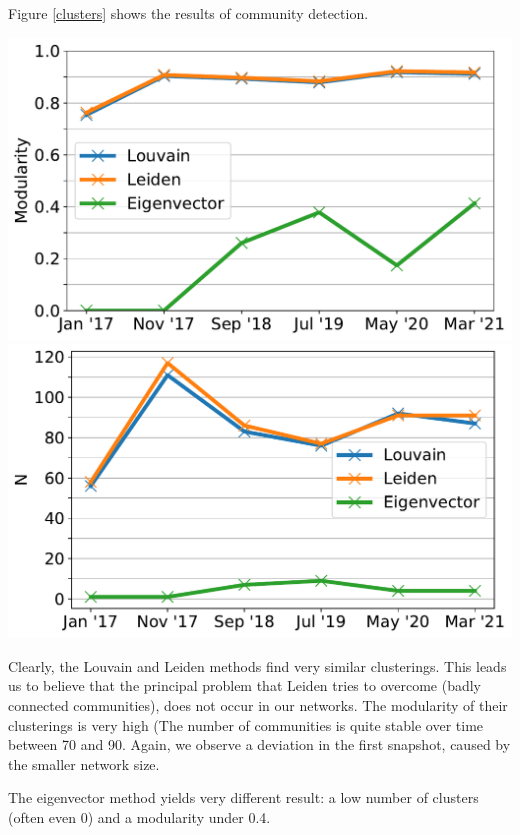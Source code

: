 \documentclass[10pt,a4paper]{article}
\newenvironment{Figure}
  {\par\medskip\noindent\minipage{\linewidth}}
  {\endminipage\par\medskip}
\begin{document}
\begin{multicols}{2}
Figure \ref{clusters} shows the results of community detection.
\vspace{5pt}
\begin{Figure}
\centering
\includegraphics[scale=0.45]{figures/clusters_modularity.pdf}
\includegraphics[scale=0.45]{figures/clusters_num.pdf}
\label{clusters}
\end{Figure}

Clearly, the Louvain and Leiden methods find very similar clusterings. This leads us to believe that the principal problem that Leiden tries to overcome (badly connected communities), does not occur in our networks. The modularity of their clusterings is very high (The number of communities is quite stable over time between 70 and 90. Again, we observe a deviation in the first snapshot, caused by the smaller network size. 

The eigenvector method yields very different result: a low number of clusters (often even 0) and a modularity under 0.4.

\end{multicols}


\end{document}
